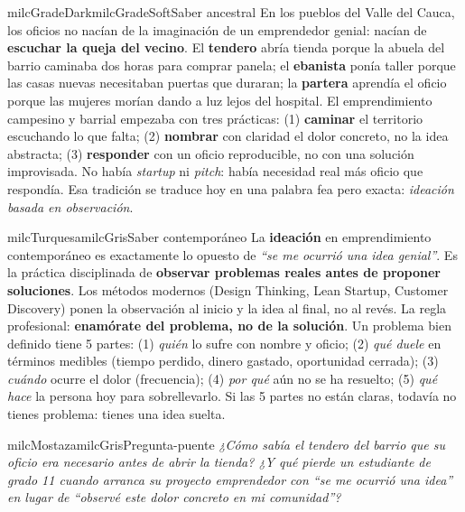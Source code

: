 \documentclass[11pt,letterpaper]{article}
\begin{document}
\begin{softbox}{milcGradeDark}{milcGradeSoft}{Saber ancestral}
En los pueblos del Valle del Cauca, los oficios no nacían de la imaginación de un emprendedor genial: nacían de \textbf{escuchar la queja del vecino}. El \textbf{tendero} abría tienda porque la abuela del barrio caminaba dos horas para comprar panela; el \textbf{ebanista} ponía taller porque las casas nuevas necesitaban puertas que duraran; la \textbf{partera} aprendía el oficio porque las mujeres morían dando a luz lejos del hospital. El emprendimiento campesino y barrial empezaba con tres prácticas: (1) \textbf{caminar} el territorio escuchando lo que falta; (2) \textbf{nombrar} con claridad el dolor concreto, no la idea abstracta; (3) \textbf{responder} con un oficio reproducible, no con una solución improvisada. No había \emph{startup} ni \emph{pitch}: había necesidad real más oficio que respondía. Esa tradición se traduce hoy en una palabra fea pero exacta: \emph{ideación basada en observación}.
\end{softbox}

\begin{softbox}{milcTurquesa}{milcGris}{Saber contemporáneo}
La \textbf{ideación} en emprendimiento contemporáneo es exactamente lo opuesto de \emph{``se me ocurrió una idea genial''}. Es la práctica disciplinada de \textbf{observar problemas reales antes de proponer soluciones}. Los métodos modernos (Design Thinking, Lean Startup, Customer Discovery) ponen la observación al inicio y la idea al final, no al revés. La regla profesional: \textbf{enamórate del problema, no de la solución}. Un problema bien definido tiene 5 partes: (1) \emph{quién} lo sufre con nombre y oficio; (2) \emph{qué duele} en términos medibles (tiempo perdido, dinero gastado, oportunidad cerrada); (3) \emph{cuándo} ocurre el dolor (frecuencia); (4) \emph{por qué} aún no se ha resuelto; (5) \emph{qué hace} la persona hoy para sobrellevarlo. Si las 5 partes no están claras, todavía no tienes problema: tienes una idea suelta.
\end{softbox}

\begin{softbox}{milcMostaza}{milcGris}{Pregunta-puente}
\textit{¿Cómo sabía el tendero del barrio que su oficio era necesario antes de abrir la tienda? ¿Y qué pierde un estudiante de grado 11 cuando arranca su proyecto emprendedor con \emph{``se me ocurrió una idea''} en lugar de \emph{``observé este dolor concreto en mi comunidad''}?}
\end{softbox}
\end{document}
